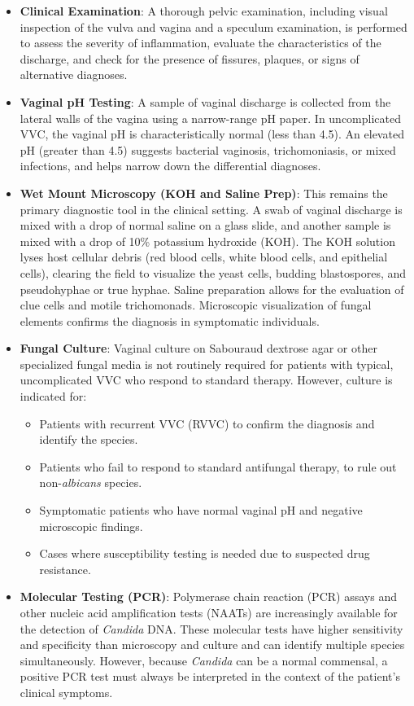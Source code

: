 \begin{itemize}
    \item \textbf{Clinical Examination}: A thorough pelvic examination, including visual inspection of the vulva and vagina and a speculum examination, is performed to assess the severity of inflammation, evaluate the characteristics of the discharge, and check for the presence of fissures, plaques, or signs of alternative diagnoses.
    \item \textbf{Vaginal pH Testing}: A sample of vaginal discharge is collected from the lateral walls of the vagina using a narrow-range pH paper. In uncomplicated VVC, the vaginal pH is characteristically normal (less than 4.5). An elevated pH (greater than 4.5) suggests bacterial vaginosis, trichomoniasis, or mixed infections, and helps narrow down the differential diagnoses.
    \item \textbf{Wet Mount Microscopy (KOH and Saline Prep)}: This remains the primary diagnostic tool in the clinical setting. A swab of vaginal discharge is mixed with a drop of normal saline on a glass slide, and another sample is mixed with a drop of 10\% potassium hydroxide (KOH). The KOH solution lyses host cellular debris (red blood cells, white blood cells, and epithelial cells), clearing the field to visualize the yeast cells, budding blastospores, and pseudohyphae or true hyphae. Saline preparation allows for the evaluation of clue cells and motile trichomonads. Microscopic visualization of fungal elements confirms the diagnosis in symptomatic individuals.
    \item \textbf{Fungal Culture}: Vaginal culture on Sabouraud dextrose agar or other specialized fungal media is not routinely required for patients with typical, uncomplicated VVC who respond to standard therapy. However, culture is indicated for:
    \begin{itemize}
        \item Patients with recurrent VVC (RVVC) to confirm the diagnosis and identify the species.
        \item Patients who fail to respond to standard antifungal therapy, to rule out non-\textit{albicans} species.
        \item Symptomatic patients who have normal vaginal pH and negative microscopic findings.
        \item Cases where susceptibility testing is needed due to suspected drug resistance.
    \end{itemize}
    \item \textbf{Molecular Testing (PCR)}: Polymerase chain reaction (PCR) assays and other nucleic acid amplification tests (NAATs) are increasingly available for the detection of \textit{Candida} DNA. These molecular tests have higher sensitivity and specificity than microscopy and culture and can identify multiple species simultaneously. However, because \textit{Candida} can be a normal commensal, a positive PCR test must always be interpreted in the context of the patient's clinical symptoms.
\end{itemize}

